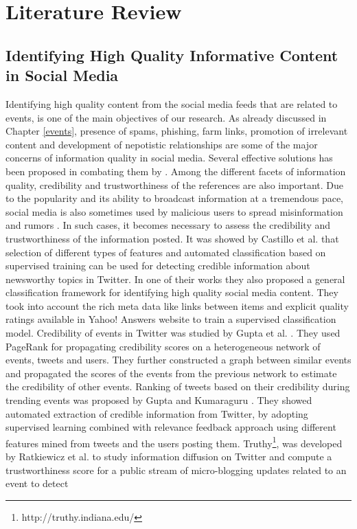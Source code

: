 
\chapter{Literature Review} %

\label{review} %

\doublespacing
\setlength{\parindent}{1cm}
\section{Identifying High Quality Informative Content in Social Media}
Identifying high quality content from the social media feeds that are related to events, is one of the main objectives of our research. As already discussed in Chapter \ref{events}, presence of spams, phishing, farm links, promotion of irrelevant content and development of nepotistic relationships are some of the major concerns of information quality in social media. Several effective solutions has been proposed in combating them by \cite{benevenuto2010detecting,chhabra2011phi,grier2010spam,yardi2009detecting}. Among the different facets of information quality, credibility and trustworthiness of the references are also important.  Due to the popularity and its ability to broadcast information at a tremendous pace, social media is also sometimes used by malicious users to spread misinformation and rumors \cite{tonkin2012twitter}. In such cases, it becomes necessary to assess the credibility and trustworthiness of the information posted. It was showed by Castillo et al. \cite{castillo2011information} that selection of different types of features and automated classification based on supervised training can be used for detecting credible information about newsworthy topics in Twitter. In one of their works \cite{agichtein2008finding} they also proposed a general classification framework for identifying high quality social media content. They took into account the rich meta data like links between items and explicit quality ratings available in Yahoo! Answers website to train a supervised classification model. Credibility of events in Twitter was studied by Gupta et al. \cite{gupta2012evaluating}. They used PageRank for propagating credibility scores on a heterogeneous network of events, tweets and users. They further constructed a graph between similar events and propagated the scores of the events from the previous network to estimate the credibility of other events. Ranking of tweets based on their credibility during trending events was proposed by Gupta and Kumaraguru \cite{gupta2012credibility}. They showed automated extraction of credible information from Twitter, by adopting supervised learning combined with relevance feedback approach using different features mined from tweets and the users posting them. Truthy\footnote{http://truthy.indiana.edu/}, was developed by Ratkiewicz et al. to study information diffusion on Twitter and compute a trustworthiness score for a public stream of micro-blogging updates related to an event to detect 